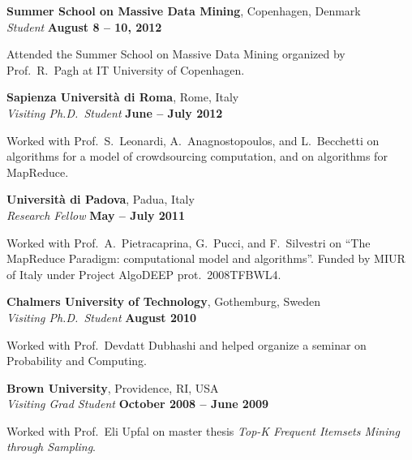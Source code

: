 \documentclass[margin,line]{resume}
\begin{document}
{\bf Summer School on Massive Data Mining}, Copenhagen, Denmark \\
{\em Student} \hfill {\bf August 8 -- 10, 2012}

\begin{list2}
  \vspace*{.05in}
\item Attended the Summer School on Massive Data Mining organized by
  Prof.~R.~Pagh at IT University of Copenhagen.
\end{list2}

{\bf Sapienza Universit\`a di Roma}, Rome, Italy\\
{\em Visiting Ph.D.~Student} \hfill {\bf June -- July 2012}

\begin{list2}
\vspace*{.05in}
\item Worked with Prof.~S.~Leonardi, A.~Anagnostopoulos, and L.~Becchetti on
  algorithms for a model of crowdsourcing computation, and on algorithms for
  MapReduce.
\end{list2}

{\bf Universit\`a di Padova}, Padua, Italy\\
{\em Research Fellow} \hfill {\bf May -- July 2011}

\begin{list2}
\vspace*{.05in}
\item Worked with Prof.~A.~Pietracaprina, G.~Pucci, and F.~Silvestri on ``The MapReduce Paradigm:
computational model and algorithms''. Funded by MIUR of Italy under Project AlgoDEEP prot.~2008TFBWL4.
\end{list2}

{\bf Chalmers University of Technology}, Gothemburg, Sweden\\
{\em Visiting Ph.D.~Student} \hfill {\bf August 2010}

\begin{list2}
\vspace*{.05in}
\item Worked with Prof.~Devdatt Dubhashi and helped organize a seminar on Probability and Computing.
\end{list2}

{\bf Brown University}, Providence, RI, USA\\
{\em Visiting Grad Student} \hfill {\bf October 2008 -- June 2009}

\begin{list2}
\vspace*{.05in}
\item Worked with Prof.~Eli Upfal on master thesis \textit{Top-K Frequent
  Itemsets Mining through Sampling}.
\end{list2}
\end{document}
